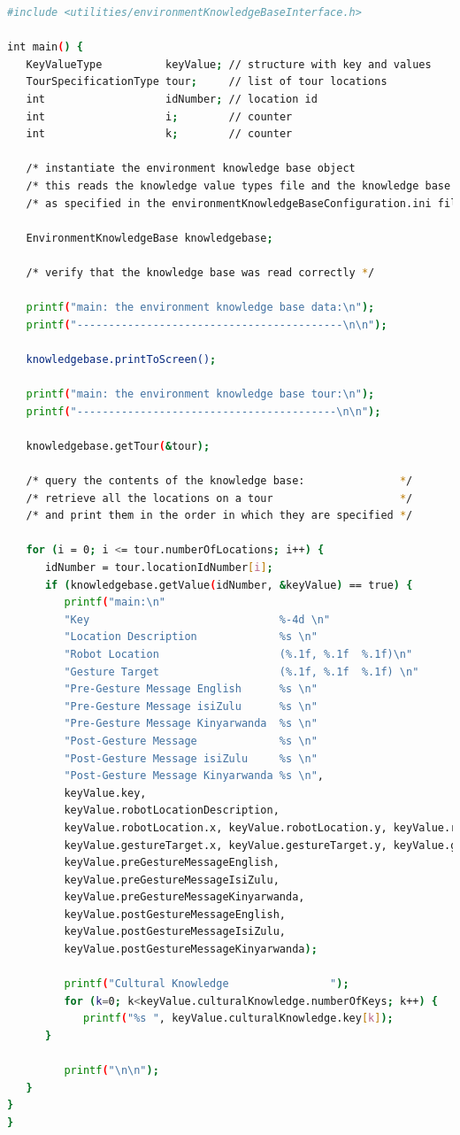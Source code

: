 \documentclass{CSSRforAfrica}
\begin{document}
\begin{lstlisting}[style=withoutNumbering, language=bash]
#include <utilities/environmentKnowledgeBaseInterface.h>

int main() {
   KeyValueType          keyValue; // structure with key and values
   TourSpecificationType tour;     // list of tour locations
   int                   idNumber; // location id
   int                   i;        // counter
   int                   k;        // counter

   /* instantiate the environment knowledge base object                      */
   /* this reads the knowledge value types file and the knowledge base file  */
   /* as specified in the environmentKnowledgeBaseConfiguration.ini file     */
  
   EnvironmentKnowledgeBase knowledgebase;  

   /* verify that the knowledge base was read correctly */

   printf("main: the environment knowledge base data:\n");
   printf("------------------------------------------\n\n");
   
   knowledgebase.printToScreen();

   printf("main: the environment knowledge base tour:\n");
   printf("-----------------------------------------\n\n");

   knowledgebase.getTour(&tour);
  
   /* query the contents of the knowledge base:               */
   /* retrieve all the locations on a tour                    */
   /* and print them in the order in which they are specified */

   for (i = 0; i <= tour.numberOfLocations; i++) {
      idNumber = tour.locationIdNumber[i];
      if (knowledgebase.getValue(idNumber, &keyValue) == true) {
         printf("main:\n"
         "Key                              %-4d \n"
         "Location Description             %s \n"
         "Robot Location                   (%.1f, %.1f  %.1f)\n"
         "Gesture Target                   (%.1f, %.1f  %.1f) \n"
         "Pre-Gesture Message English      %s \n"
         "Pre-Gesture Message isiZulu      %s \n"
         "Pre-Gesture Message Kinyarwanda  %s \n"
         "Post-Gesture Message             %s \n"
         "Post-Gesture Message isiZulu     %s \n"
         "Post-Gesture Message Kinyarwanda %s \n",
         keyValue.key,
         keyValue.robotLocationDescription, 
         keyValue.robotLocation.x, keyValue.robotLocation.y, keyValue.robotLocation.theta,
         keyValue.gestureTarget.x, keyValue.gestureTarget.y, keyValue.gestureTarget.z,
         keyValue.preGestureMessageEnglish,
         keyValue.preGestureMessageIsiZulu,
         keyValue.preGestureMessageKinyarwanda,
         keyValue.postGestureMessageEnglish,
         keyValue.postGestureMessageIsiZulu,
         keyValue.postGestureMessageKinyarwanda);

         printf("Cultural Knowledge                ");
         for (k=0; k<keyValue.culturalKnowledge.numberOfKeys; k++) {
            printf("%s ", keyValue.culturalKnowledge.key[k]);
      }

         printf("\n\n");
   }
}
}
\end{lstlisting}
\end{document}
